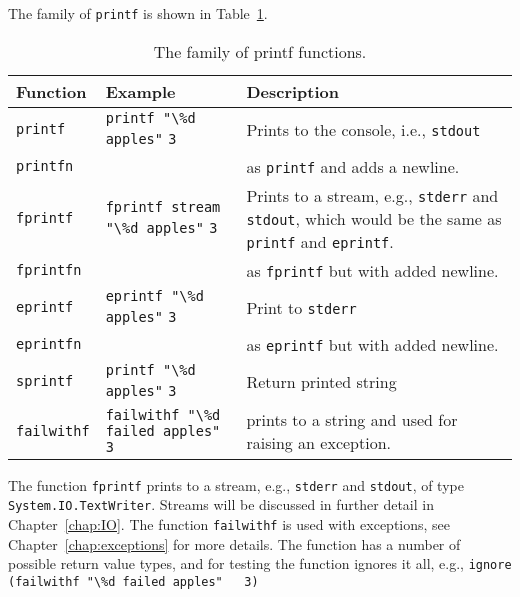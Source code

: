 The family of \lstinline!printf! is shown in Table~\ref{tab:printfFamily}.
\begin{table}
  \centering
  \begin{tabularx}{\linewidth}{|l|l|X|}
    \hline
    \rowcolor{headerRowColor} Function & Example & Description\\
    \hline
    \lstinline!printf! & \lstinline!printf "\%d apples"! \lstinline!3! & Prints to the console, i.e., \lstinline!stdout!\\
    \lstinline!printfn! &  & as \lstinline!printf! and adds a newline.\\
    \hline
    \lstinline!fprintf! & \lstinline!fprintf stream "\%d apples"! \lstinline!3! & Prints to a stream, e.g., \lstinline!stderr! and \lstinline!stdout!, which would be the same as \lstinline!printf! and \lstinline!eprintf!.\\
    \lstinline!fprintfn! & & as \lstinline!fprintf! but with added newline.\\
    \hline
    \lstinline!eprintf! & \lstinline!eprintf "\%d apples"! \lstinline!3! & Print to \lstinline!stderr!\\
    \lstinline!eprintfn! & & as \lstinline!eprintf! but with added newline.\\
    \hline
    \lstinline!sprintf! & \lstinline!printf "\%d apples"! \lstinline!3! & Return printed string\\
    \hline
    \lstinline!failwithf! & \lstinline!failwithf "\%d failed apples"! \lstinline!3! & prints to a string and used for raising an exception.\\
    \hline
  \end{tabularx}
  \caption{The family of printf functions.}
  \label{tab:printfFamily}
\end{table}
The function \lstinline!fprintf! prints to a stream, e.g., \lstinline!stderr! and \lstinline!stdout!, of type \lstinline!System.IO.TextWriter!. Streams will be discussed in further detail in Chapter~\ref{chap:IO}. The function \lstinline!failwithf! is used with exceptions, see Chapter~\ref{chap:exceptions} for more details. The function has a number of possible return value types, and for testing the  function ignores it all, e.g., \mbox{\lstinline!ignore (failwithf "\%d failed apples"   3)!}


